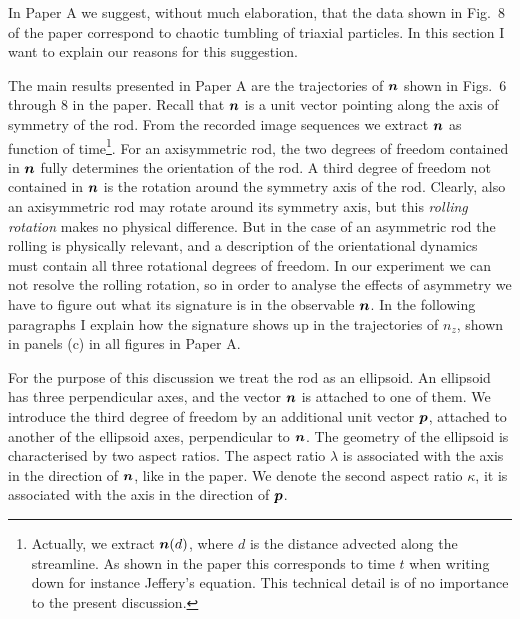 \documentclass[thesis.tex]{subfiles}
\begin{document}
In Paper A we suggest, without much elaboration, that the data shown in Fig.~8 of the paper correspond to chaotic tumbling of triaxial particles. In this section I want to explain our reasons for this suggestion.

The main results presented in Paper A are the trajectories of $\mbox{\boldmath$n$}$ shown in Figs.~6 through 8 in the paper. Recall that $\mbox{\boldmath$n$}$ is a unit vector pointing along the axis of symmetry of the rod. From the recorded image sequences we extract $\mbox{\boldmath$n$}$ as function of time\footnote{Actually, we extract $\mbox{\boldmath$n$}(d)$, where $d$ is the distance advected along the streamline. As shown in the paper this corresponds to time $t$ when writing down for instance Jeffery's equation. This technical detail is of no importance to the present discussion.}. For an axisymmetric rod, the two degrees of freedom contained in $\mbox{\boldmath$n$}$ fully determines the orientation of the rod. A third degree of freedom not contained in $\mbox{\boldmath$n$}$ is the rotation around the symmetry axis of the rod. Clearly, also an axisymmetric rod may rotate around its symmetry axis, but this \emph{rolling rotation} makes no physical difference. But in the case of an asymmetric rod the rolling is physically relevant, and a description of the orientational dynamics must contain all three rotational degrees of freedom. In our experiment we can not resolve the rolling rotation, so in order to analyse the effects of asymmetry we have to figure out what its signature is in the observable $\mbox{\boldmath$n$}$. In the following paragraphs I explain how the signature shows up in the trajectories of $n_z$, shown in panels (c) in all figures in Paper A. 

For the purpose of this discussion we treat the rod as an ellipsoid. An ellipsoid has three perpendicular axes, and the vector $\mbox{\boldmath$n$}$ is attached to one of them. We introduce the third degree of freedom by an additional unit vector $\mbox{\boldmath$p$}$, attached to another of the ellipsoid axes, perpendicular to $\mbox{\boldmath$n$}$. The geometry of the ellipsoid is characterised by two aspect ratios. The aspect ratio $\lambda$ is associated with the axis in the direction of $\mbox{\boldmath$n$}$, like in the paper. We denote the second aspect ratio $\kappa$, it is associated with the axis in the direction of $\mbox{\boldmath$p$}$. 
\end{document}
